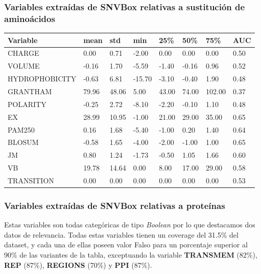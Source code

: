 
\subsubsection{Variables extraídas de SNVBox relativas a sustitución de aminoácidos}

\begin{table}[H]
\begin{tabular}{|l|l|l|l|l|l|l|l|}
\hline
Variable & mean   & std    & min    & 25\%  & 50\%   & 75\%   & AUC    \\ \hline
CHARGE            & 0.00  & 0.71   & -2.00  & 0.00  & 0.00   & 0.00   & 0.50   \\ \hline
VOLUME            & -0.16  & 1.70   & -5.59  & -1.40 & -0.16  & 0.96   & 0.52   \\ \hline
HYDROPHOBICITY    & -0.63  & 6.81   & -15.70 & -3.10 & -0.40  & 1.90   & 0.48  \\ \hline
GRANTHAM          & 79.96  & 48.06  & 5.00   & 43.00 & 74.00  & 102.00 & 0.37 \\ \hline
POLARITY          & -0.25  & 2.72   & -8.10  & -2.20 & -0.10  & 1.10   & 0.48   \\ \hline
EX                & 28.99  & 10.95  & -1.00  & 21.00 & 29.00  & 35.00  & 0.65  \\ \hline
PAM250            & 0.16   & 1.68   & -5.40  & -1.00 & 0.20   & 1.40   & 0.64   \\ \hline
BLOSUM            & -0.58  & 1.65   & -4.00  & -2.00 & -1.00  & 1.00   & 0.65   \\ \hline
JM                & 0.80   & 1.24   & -1.73  & -0.50 & 1.05   & 1.66   & 0.60   \\ \hline
VB                & 19.78  & 14.64  & 0.00   & 8.00  & 17.00  & 29.00  & 0.58  \\ \hline
TRANSITION        & 0.00   & 0.00   & 0.00   & 0.00  & 0.00   & 0.00   & 0.53   \\ \hline
\end{tabular}
\end{table}

\subsubsection{Variables extraídas de SNVBox relativas a proteínas}

Estas variables son todas categóricas de tipo \textit{Boolean} por lo que destacamos dos datos de relevancia. Todas estas variables tienen un coverage del 31.5\% del dataset, y cada una de ellas poseen valor Falso para un porcentaje superior al 90\% de las variantes de la tabla, exceptuando la variable \textbf{TRANSMEM} (82\%), \textbf{REP} (87\%), \textbf{REGIONS} (70\%) y \textbf{PPI} (87\%).


